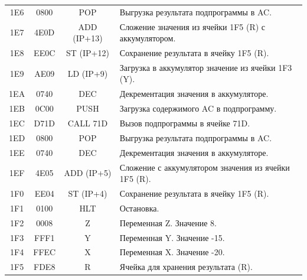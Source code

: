 \begin{center}
\begin{tabular}{|c|c|c|l|}
        1E6                   & 0800                  & POP                & Выгрузка результата подпрограммы в AC.               \\
        1E7                   & 4E0D                  & ADD (IP+13)        & Сложение значения из ячейки 1F5 (R) с аккумулятором. \\
        1E8                   & EE0C                  & ST (IP+12)         & Сохранение результата в ячейку 1F5 (R).              \\
        1E9                   & AE09                  & LD (IP+9)          & Загрузка в аккумулятор значение из ячейки 1F3 (Y).   \\
        1EA                   & 0740                  & DEC                & Декрементация значения в аккумуляторе.               \\
        1EB                   & 0C00                  & PUSH               & Загрузка содержимого AC в подпрограмму.              \\
        1EC                   & D71D                  & CALL 71D           & Вызов подпрограммы в ячейке 71D.                     \\
        1ED                   & 0800                  & POP                & Выгрузка результата подпрограммы в AC.               \\
        1EE                   & 0740                  & DEC                & Декрементация значения в аккумуляторе.               \\
        1EF                   & 4E05                  & ADD (IP+5)         & Сложение с аккумулятором значения из ячейки 1F5 (R). \\
        1F0                   & EE04                  & ST (IP+4)          & Сохранение результата в ячейку 1F5 (R).              \\
        1F1                   & 0100                  & HLT                & Остановка.                                           \\
        \hline
        1F2                   & 0008                  & Z                  & Переменная Z. Значение 8.                            \\
        1F3                   & FFF1                  & Y                  & Переменная Y. Значение -15.                          \\
        1F4                   & FFEC                  & X                  & Переменная X. Значение -20.                          \\
        1F5                   & FDE8                  & R                  & Ячейка для хранения результата (R).                  \\
        \hline
    \end{tabular}
\end{center}


